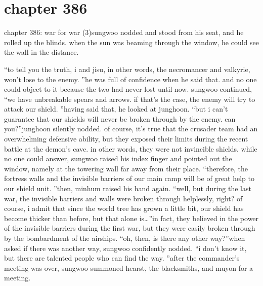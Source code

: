 \section{chapter 386}

chapter 386: war for war (3)sungwoo nodded and stood from his seat, and he rolled up the blinds.
 when the sun was beaming through the window, he could see the wall in the distance.





“to tell you the truth, i and jisu, in other words, the necromancer and valkyrie, won’t lose to the enemy.
”he was full of confidence when he said that.
 and no one could object to it because the two had never lost until now.
sungwoo continued, “we have unbreakable spears and arrows.
 if that’s the case, the enemy will try to attack our shield.
”having said that, he looked at junghoon.
“but i can’t guarantee that our shields will never be broken through by the enemy.
 can you?”junghoon silently nodded.
 of course, it’s true that the crusader team had an overwhelming defensive ability, but they exposed their limits during the recent battle at the demon’s cave.
in other words, they were not invincible shields.
while no one could answer, sungwoo raised his index finger and pointed out the window, namely at the towering wall far away from their place.
“therefore, the fortress walls and the invisible barriers of our main camp will be of great help to our shield unit.
”then, minhum raised his hand again.
“well, but during the last war, the invisible barriers and walls were broken through helplessly, right? of course, i admit that since the world tree has grown a little bit, our shield has become thicker than before, but that alone is…”in fact, they believed in the power of the invisible barriers during the first war, but they were easily broken through by the bombardment of the airships.
“oh, then, is there any other way?”when asked if there was another way, sungwoo confidently nodded.
“i don’t know it, but there are talented people who can find the way.
”after the commander’s meeting was over, sungwoo summoned hearst, the blacksmiths, and muyon for a meeting.


